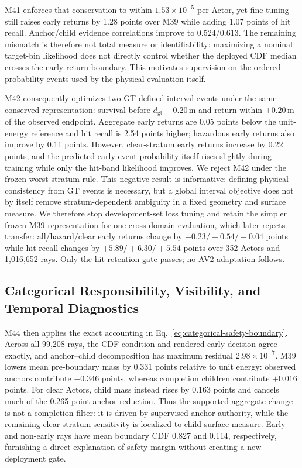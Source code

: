 M41 enforces that conservation to within $1.53\times10^{-5}$ per Actor, yet fine-tuning still raises early returns by
1.28 points over M39 while adding 1.07 points of hit recall. Anchor/child evidence correlations improve to 0.524/0.613.
The remaining mismatch is therefore not total measure or identifiability: maximizing a nominal target-bin likelihood does
not directly control whether the deployed CDF median crosses the early-return boundary. This motivates supervision on the
ordered probability events used by the physical evaluation itself.

M42 consequently optimizes two GT-defined interval events under the same conserved representation: survival before
$d_{\mathrm{gt}}-0.20$\,m and return within $\pm0.20$\,m of the observed endpoint. Aggregate early returns are 0.05 points
below the unit-energy reference and hit recall is 2.54 points higher; hazardous early returns also improve by 0.11 points.
However, clear-stratum early returns increase by 0.22 points, and the predicted early-event probability itself rises
slightly during training while only the hit-band likelihood improves. We reject M42 under the frozen worst-stratum rule.
This negative result is informative: defining physical consistency from GT events is necessary, but a global interval
objective does not by itself remove stratum-dependent ambiguity in a fixed geometry and surface measure. We therefore stop
development-set loss tuning and retain the simpler frozen M39 representation for one cross-domain evaluation, which later
rejects transfer: all/hazard/clear early returns change by $+0.23/+0.54/-0.04$ points while hit recall changes by
$+5.89/+6.30/+5.54$ points over 352 Actors and 1,016,652 rays. Only the hit-retention gate passes; no AV2 adaptation follows.

\subsection{Categorical Responsibility, Visibility, and Temporal Diagnostics}

M44 then applies the exact accounting in Eq.~\ref{eq:categorical-safety-boundary}. Across all 99,208 rays, the CDF
condition and rendered early decision agree exactly, and anchor--child decomposition has maximum residual
$2.98\times10^{-7}$. M39 lowers mean pre-boundary mass by 0.331 points relative to unit energy: observed anchors contribute
$-0.346$ points, whereas completion children contribute $+0.016$ points. For clear Actors, child mass instead rises by
0.163 points and cancels much of the 0.265-point anchor reduction. Thus the supported aggregate change is not a completion
filter: it is driven by supervised anchor authority, while the remaining clear-stratum sensitivity is localized to child
surface measure. Early and non-early rays have mean boundary CDF 0.827 and 0.114, respectively, furnishing a direct
explanation of safety margin without creating a new deployment gate.

